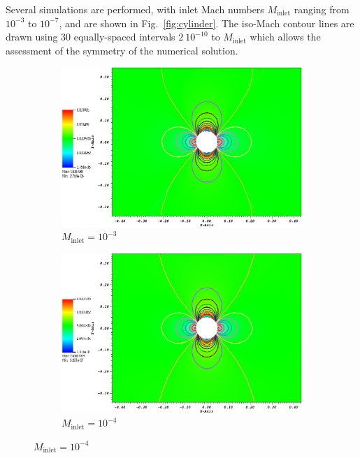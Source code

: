 \documentclass[preprint,10pt]{elsarticle}
\newcommand{\fig}[1]{Fig.~\ref{#1}}                      %
\begin{document}
Several simulations are performed, with inlet Mach numbers $M_{\text{inlet}}$ ranging from $10^{-3}$ to $10^{-7}$, and are shown in \fig{fig:cylinder}. The iso-Mach contour lines are drawn using 30 equally-spaced intervals $2 \ 10^{-10}$ to $M_{\text{inlet}}$ which allows the assessment of the symmetry of the numerical solution.
%
\begin{figure}[H]
        \centering
        \begin{subfigure}[b]{0.495\textwidth}
                \centering
                \includegraphics[width=\textwidth]{CylinderMach1em3ZoomIn.png}
                \caption{$M_{\text{inlet}}=10^{-3}$}
                \label{fig:cyl_1em3}
        \end{subfigure}%

        \begin{subfigure}[b]{0.495\textwidth}
                \centering
                \includegraphics[width=\textwidth]{CylinderMach1em4ZoomIn.png}
                \caption{$M_{\text{inlet}}=10^{-4}$}
                \label{fig:cyl_1em4}
        \end{subfigure}    


\end{figure}
\end{document}
